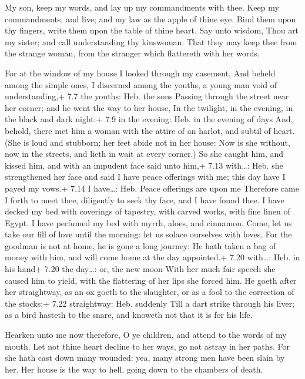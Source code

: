  My son, keep my words, and lay up my commandments with
thee.  Keep my commandments, and live; and my law as the
apple of thine eye.  Bind them upon thy fingers, write them
upon the table of thine heart.  Say unto wisdom, Thou art my
sister; and call understanding thy kinswoman:  That they may
keep thee from the strange woman, from the stranger which flattereth
with her words.

 For at the window of my house I looked through my
casement,  And beheld among the simple ones, I discerned
among the youths, a young man void of understanding,+ 7.7 the youths:
Heb. the sons  Passing through the street near her corner;
and he went the way to her house,  In the twilight, in the
evening, in the black and dark night:+ 7.9 in the evening: Heb. in the
evening of days  And, behold, there met him a woman with
the attire of an harlot, and subtil of heart.  (She is loud
and stubborn; her feet abide not in her house:  Now is she
without, now in the streets, and lieth in wait at every corner.)
 So she caught him, and kissed him, and with an impudent
face said unto him,+ 7.13 with\ldots: Heb. she strengthened her face and
said  I have peace offerings with me; this day have I payed
my vows.+ 7.14 I have\ldots: Heb. Peace offerings are upon me
 Therefore came I forth to meet thee, diligently to seek
thy face, and I have found thee.  I have decked my bed with
coverings of tapestry, with carved works, with fine linen of Egypt.
 I have perfumed my bed with myrrh, aloes, and cinnamon.
 Come, let us take our fill of love until the morning: let
us solace ourselves with loves.  For the goodman is not at
home, he is gone a long journey:  He hath taken a bag of
money with him, and will come home at the day appointed.+ 7.20
with\ldots: Heb. in his hand+ 7.20 the day\ldots: or, the new moon
 With her much fair speech she caused him to yield, with
the flattering of her lips she forced him.  He goeth after
her straightway, as an ox goeth to the slaughter, or as a fool to the
correction of the stocks;+ 7.22 straightway: Heb. suddenly 
Till a dart strike through his liver; as a bird hasteth to the snare,
and knoweth not that it is for his life.

 Hearken unto me now therefore, O ye children, and attend
to the words of my mouth.  Let not thine heart decline to
her ways, go not astray in her paths.  For she hath cast
down many wounded: yea, many strong men have been slain by her.
 Her house is the way to hell, going down to the chambers
of death.

